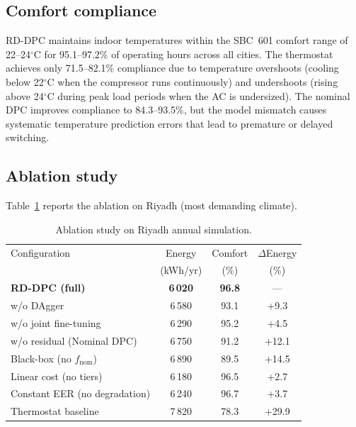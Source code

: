 \documentclass[12pt]{article}
\theoremstyle{plain}
\theoremstyle{definition}
\begin{document}
\subsection{Comfort compliance}

RD-DPC maintains indoor temperatures within the SBC~601 comfort range of 22--24$^\circ$C for 95.1--97.2\% of operating hours across all cities. The thermostat achieves only 71.5--82.1\% compliance due to temperature overshoots (cooling below 22$^\circ$C when the compressor runs continuously) and undershoots (rising above 24$^\circ$C during peak load periods when the AC is undersized). The nominal DPC improves compliance to 84.3--93.5\%, but the model mismatch causes systematic temperature prediction errors that lead to premature or delayed switching.

\subsection{Ablation study}

Table~\ref{tab:ablation} reports the ablation on Riyadh (most demanding climate).

\begin{table}[H]
\centering
\caption{Ablation study on Riyadh annual simulation.}\label{tab:ablation}

\begin{tabular*}{\textwidth}{@{\extracolsep{\fill}}lccc}
\toprule
Configuration & Energy & Comfort & $\Delta$Energy \\
 & (kWh/yr) & (\%) & (\%) \\
\midrule
\textbf{RD-DPC (full)} & \textbf{6\,020} & \textbf{96.8} & --- \\
w/o DAgger & 6\,580 & 93.1 & +9.3 \\
w/o joint fine-tuning & 6\,290 & 95.2 & +4.5 \\
w/o residual (Nominal DPC) & 6\,750 & 91.2 & +12.1 \\
Black-box (no $f_{\text{nom}}$) & 6\,890 & 89.5 & +14.5 \\
Linear cost (no tiers) & 6\,180 & 96.5 & +2.7 \\
Constant EER (no degradation) & 6\,240 & 96.7 & +3.7 \\
Thermostat baseline & 7\,820 & 78.3 & +29.9 \\
\bottomrule
\end{tabular*}
\end{table}
\end{document}

